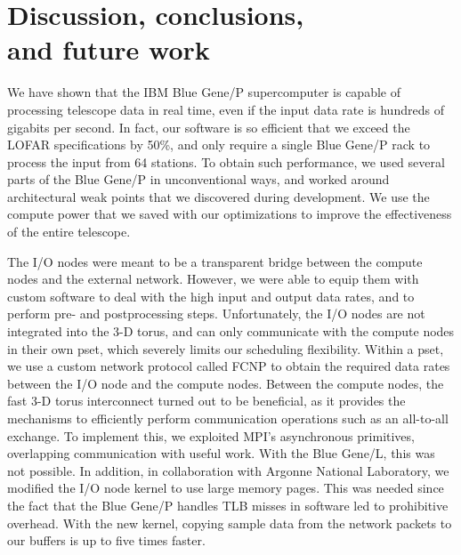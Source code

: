 \documentclass{sig-alternate}
\begin{document}



\section{Discussion, conclusions, \\ and future work}
\label{sec:conclusions}

We have shown that the IBM Blue Gene/P supercomputer is capable of
processing telescope data in real time, even if the input data rate is
hundreds of gigabits per second. In fact, our software is so efficient
that we exceed the LOFAR specifications by 50\%, and only require
a single Blue Gene/P rack to process the input from 64
stations. To obtain such performance, we used several parts of the
Blue Gene/P in unconventional ways, and worked around architectural weak points 
that we discovered during development. We use the
compute power that we saved with our optimizations to improve the
effectiveness of the entire telescope.

The I/O nodes were meant to be a transparent bridge between the
compute nodes and the external network. However, we were able to equip
them with custom software to deal with the high input and output data
rates, and to perform pre- and postprocessing steps.  Unfortunately,
the I/O nodes are not integrated into the 3-D torus, and can only
communicate with the compute nodes in their own pset, which severely
limits our scheduling flexibility.  Within a pset, we use a custom
network protocol called FCNP to obtain the required data rates between the I/O node and the
compute nodes. Between the compute nodes, the fast 3-D torus
interconnect turned out to be beneficial, as it provides the
mechanisms to efficiently perform communication operations such as an
all-to-all exchange.  To implement this, we exploited MPI's
asynchronous primitives, overlapping communication with useful
work. With the Blue Gene/L, this was not possible.  In addition, in
collaboration with Argonne National Laboratory, we modified the
I/O node kernel to use large memory pages.  This was needed since
the fact that the Blue Gene/P handles TLB misses in software led to
prohibitive overhead. With the new kernel, copying sample data from
the network packets to our buffers is up to five times faster.
\end{document}

